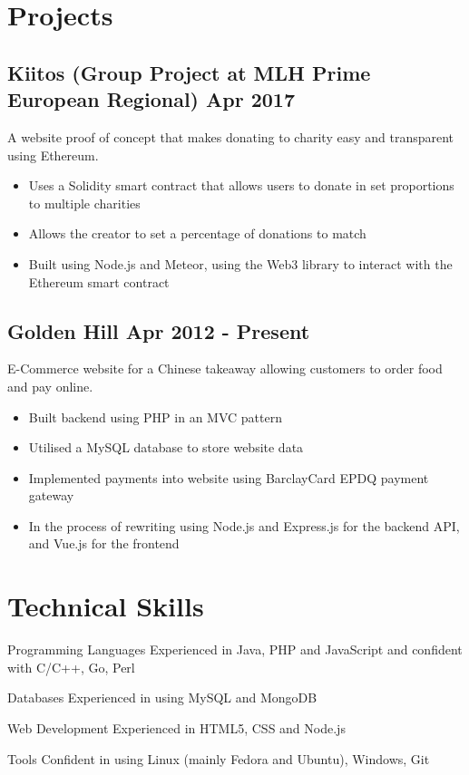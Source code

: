 \documentclass[a4paper]{article}
\begin{document}
\section*{Projects}

\subsection*{Kiitos \textnormal{(Group Project at MLH Prime European Regional)} \hfill Apr 2017}

A website proof of concept that makes donating to charity easy and transparent using Ethereum.

\begin{itemize}
    \item Uses a Solidity smart contract that allows users to donate in set proportions to multiple charities
    \item Allows the creator to set a percentage of donations to match
    \item Built using Node.js and Meteor, using the Web3 library to interact with the Ethereum smart contract
\end{itemize}

\subsection*{Golden Hill \hfill Apr 2012 - Present}

E-Commerce website for a Chinese takeaway allowing customers to order food and pay online.

\begin{itemize}
    \item Built backend using PHP in an MVC pattern
    \item Utilised a MySQL database to store website data
    \item Implemented payments into website using BarclayCard EPDQ payment gateway
    \item In the process of rewriting using Node.js and Express.js for the backend API, and Vue.js for the frontend
\end{itemize}

\section*{Technical Skills}

\vspace{6pt}

\begin{eqlist}
    \item[Programming Languages] Experienced in Java, PHP and JavaScript and confident with C/C++, Go, Perl
    \item[Databases] Experienced in using MySQL and MongoDB
    \item[Web Development] Experienced in HTML5, CSS and Node.js
    \item[Tools] Confident in using Linux (mainly Fedora and Ubuntu), Windows, Git
\end{eqlist}
\end{document}
